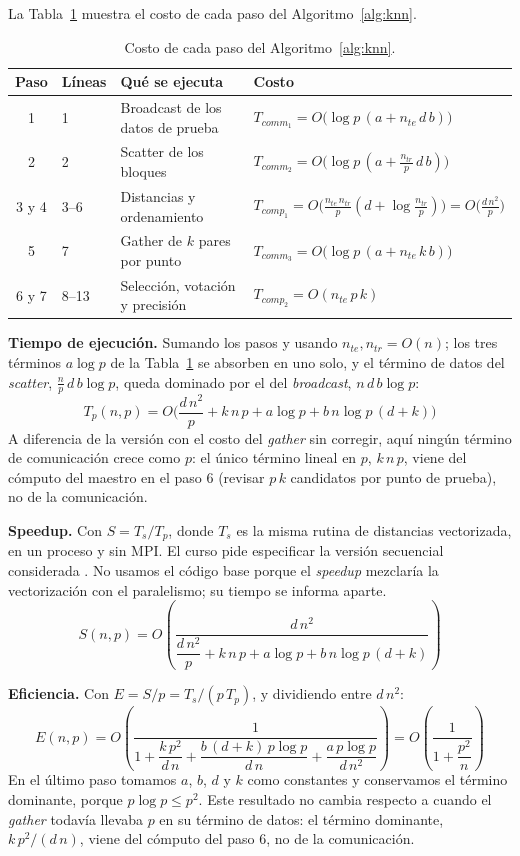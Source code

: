 \documentclass[11pt,a4paper]{article}
\newcommand{\ntr}{n_{tr}}
\newcommand{\nte}{n_{te}}
\newcommand{\tcomm}[1]{T_{comm_{#1}}}
\newcommand{\tcomp}[1]{T_{comp_{#1}}}
\begin{document}
La Tabla~\ref{tab:costos} muestra el costo de cada paso del Algoritmo~\ref{alg:knn}.

\begin{table}[ht]
\centering\small
\begin{tabular}{clll}
  \toprule
  \textbf{Paso} & \textbf{Líneas} & \textbf{Qué se ejecuta} & \textbf{Costo} \\
  \midrule
  1 & 1 & Broadcast de los datos de prueba & $\tcomm{1}=O\big(\log p\,(a+\nte\, d\, b)\big)$ \\
  2 & 2 & Scatter de los bloques & $\tcomm{2}=O\big(\log p\,(a+\tfrac{\ntr}{p}\, d\, b)\big)$ \\
  3 y 4 & 3--6 & Distancias y ordenamiento & $\tcomp{1}=O\big(\tfrac{\nte\,\ntr}{p}(d+\log\tfrac{\ntr}{p})\big)=O\big(\tfrac{d\,n^2}{p}\big)$ \\
  5 & 7 & Gather de $k$ pares por punto & $\tcomm{3}=O\big(\log p\,(a+\nte\, k\, b)\big)$ \\
  6 y 7 & 8--13 & Selección, votación y precisión & $\tcomp{2}=O(\nte\, p\, k)$ \\
  \bottomrule
\end{tabular}
\caption{Costo de cada paso del Algoritmo~\ref{alg:knn}.}
\label{tab:costos}
\end{table}

\textbf{Tiempo de ejecución.} Sumando los pasos y usando $\nte,\ntr=O(n)$; los tres términos $a\log p$ de la Tabla~\ref{tab:costos} se absorben en uno solo, y el término de datos del \textit{scatter}, $\tfrac{n}{p}\,d\,b\log p$, queda dominado por el del \textit{broadcast}, $n\,d\,b\log p$:
\[
T_p(n,p)=O\Big(\frac{d\,n^2}{p}+k\,n\,p+a\log p+b\,n\log p\,(d+k)\Big)
\]
A diferencia de la versión con el costo del \textit{gather} sin corregir, aquí ningún término de comunicación crece como $p$: el único término lineal en $p$, $k\,n\,p$, viene del cómputo del maestro en el paso 6 (revisar $p\,k$ candidatos por punto de prueba), no de la comunicación.

\textbf{Speedup.} Con $S=T_s/T_p$, donde $T_s$ es la misma rutina de distancias vectorizada, en un proceso y sin MPI. El curso pide especificar la versión secuencial considerada \cite{slides}. No usamos el código base \cite{base} porque el \textit{speedup} mezclaría la vectorización con el paralelismo; su tiempo se informa aparte.
\[
S(n,p)=O\left(\frac{d\,n^2}{\dfrac{d\,n^2}{p}+k\,n\,p+a\log p+b\,n\log p\,(d+k)}\right)
\]

\textbf{Eficiencia.} Con $E=S/p=T_s/(p\,T_p)$, y dividiendo entre $d\,n^2$:
\[
E(n,p)=O\left(\frac{1}{1+\dfrac{k\,p^2}{d\,n}+\dfrac{b\,(d+k)\,p\log p}{d\,n}+\dfrac{a\,p\log p}{d\,n^2}}\right)
=O\left(\frac{1}{1+\dfrac{p^2}{n}}\right)
\]
En el último paso tomamos $a$, $b$, $d$ y $k$ como constantes y conservamos el término dominante, porque $p\log p\le p^2$. Este resultado no cambia respecto a cuando el \textit{gather} todavía llevaba $p$ en su término de datos: el término dominante, $k\,p^2/(d\,n)$, viene del cómputo del paso 6, no de la comunicación.
\end{document}
